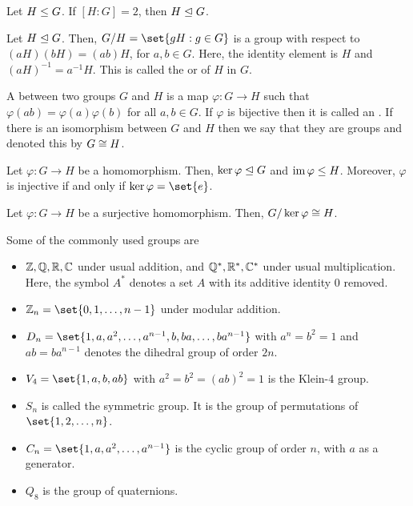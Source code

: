 \documentclass[11pt]{penrose}
\begin{document}
\begin{nthm}
    Let $H \mathrel{\leq} G$. If $[H:G] = 2$, then $H \mathrel{\trianglelefteq} G$.
\end{nthm}

\begin{nthm}
    Let $H \mathrel{\trianglelefteq} G$. Then, $G/H = \set{gH : g \in G}$ is a group with respect to $(aH)(bH) = (ab)H$, for $a, b \in G$. Here, the identity element is $H$ and $(aH)^{-1} = a^{-1} H$. This is called the  or  of $H$ in $G$.
\end{nthm}

\begin{ndfn}[Homomorphism]
    A  between two groups $G$ and $H$ is a map $\varphi : G \to H$ such that $\varphi(ab) = \varphi(a)\varphi(b)$ for all $a,b \in G$. If $\varphi$ is bijective then it is called an . If there is an isomorphism between $G$ and $H$ then we say that they are  groups and denoted this by $G \mathrel{\cong} H$.
\end{ndfn}

\begin{nthm}
    Let $\varphi : G \to H$ be a homomorphism. Then, $\ker\varphi \mathrel{\trianglelefteq} G$ and $\operatorname{im}\varphi \mathrel{\leq} H$. Moreover, $\varphi$ is injective if and only if $\ker\varphi = \set{e}$.
\end{nthm}

\begin{nthm}
    Let $\varphi : G \to H$ be a surjective homomorphism. Then, $G / \ker\varphi \mathrel{\cong} H$.
\end{nthm}

\begin{remark}
    Some of the commonly used groups are
    \begin{itemize}
        \item $\mathbb{Z}, \mathbb{Q}, \mathbb{R}, \mathbb{C}$ under usual addition, and $\mathbb{Q}^{*}, \mathbb{R}^{*}, \mathbb{C}^{*}$ under usual multiplication. Here, the symbol $A^{*}$ denotes a set $A$ with its additive identity $0$ removed.
        \item $\Z_{n} = \set{0, 1, \dots, n-1}$ under modular addition.
        \item $D_{n} = \set{1,a,a^{2},\dots,a^{n-1}, b, ba, \dots, ba^{n-1}}$ with $a^{n} = b^{2} = 1$ and $ab = ba^{n-1}$ denotes the dihedral group of order $2n$.
        \item $V_{4} = \set{1, a, b, ab}$ with $a^{2} = b^{2} = (ab)^{2} = 1$ is the Klein-$4$ group.
        \item $S_{n}$ is called the symmetric group. It is the group of permutations of $\set{1,2,\dots,n}$.
        \item $C_{n} = \set{1, a, a^{2}, \dots, a^{n-1}}$ is the cyclic group of order $n$, with $a$ as a generator.
        \item $Q_{8}$ is the group of quaternions.
    \end{itemize}
\end{remark}
\end{document}

